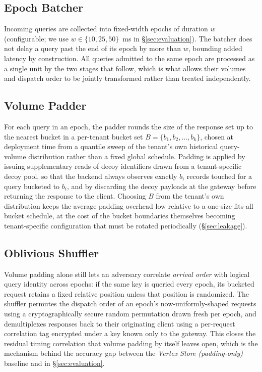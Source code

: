 \subsection{Epoch Batcher}
Incoming queries are collected into fixed-width epochs of duration $w$
(configurable; we use $w \in \{10, 25, 50\}$~ms in \S\ref{sec:evaluation}).
The batcher does not delay a query past the end of its epoch by more than
$w$, bounding added latency by construction. All queries admitted to the
same epoch are processed as a single unit by the two stages that follow,
which is what allows their volumes and dispatch order to be jointly
transformed rather than treated independently.

\subsection{Volume Padder}
For each query in an epoch, the padder rounds the size of the response set
up to the nearest bucket in a per-tenant bucket set
$B = \{b_1, b_2, \dots, b_k\}$, chosen at deployment time from a quantile
sweep of the tenant's own historical query-volume distribution rather than
a fixed global schedule. Padding is applied by issuing supplementary reads
of decoy identifiers drawn from a tenant-specific decoy pool, so that the
backend always observes exactly $b_i$ records touched for a query bucketed
to $b_i$, and by discarding the decoy payloads at the gateway before
returning the response to the client. Choosing $B$ from the tenant's own
distribution keeps the average padding overhead low relative to a
one-size-fits-all bucket schedule, at the cost of the bucket boundaries
themselves becoming tenant-specific configuration that must be rotated
periodically (\S\ref{sec:leakage}).

\subsection{Oblivious Shuffler}
Volume padding alone still lets an adversary correlate \emph{arrival
order} with logical query identity across epochs: if the same key is
queried every epoch, its bucketed request retains a fixed relative
position unless that position is randomized. The shuffler permutes the
dispatch order of an epoch's now-uniformly-shaped requests using a
cryptographically secure random permutation drawn fresh per epoch, and
demultiplexes responses back to their originating client using a
per-request correlation tag encrypted under a key known only to the
gateway. This closes the residual timing correlation that volume padding
by itself leaves open, which is the mechanism behind the accuracy gap
between the \emph{Vertex Store (padding-only)} baseline and \sysname{} in
\S\ref{sec:evaluation}.
